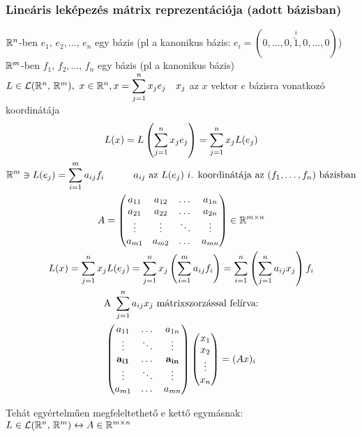 \subsubsection[Lineáris leképezés mátrix reprezentációja]{Lineáris leképezés mátrix reprezentációja (adott bázisban)}
$\mathbb{R}^n$-ben $e_1,\,e_2,\dotsc,\,e_n$ egy bázis (pl a kanonikus bázis: $e_i=(0,\dotsc,0, \overset{i}{\breve{1}},
0,\dotsc,0)$)\\
$\mathbb{R}^m$-ben $f_1,\,f_2,\dotsc,\,f_n$ egy bázis (pl a kanonikus bázis)\\
$L\in\mathcal{L}(\mathbb{R}^n,\,\mathbb{R}^m),\ x\in \mathbb{R}^n,\displaystyle x = \sum_{j=1}^n x_j e_j\quad x_j$ az $x$ vektor $e$ bázisra vonatkozó
koordinátája
\begin{gather*}
  \displaystyle  L(x) = L\left(\sum_{j=1}^n x_j e_j\right) = \sum_{j=1}^n x_j L(e_j)\\
  \mathbb{R}^m \owns L(e_j) = \sum_{i=1}^m a_{ij} f_i\qquad\quad\text{$a_{ij}$ az $L(e_j)$ $i$. koordinátája az
  $(f_1,\dotsc,f_n)$ bázisban}\\
  A = \begin{pmatrix}
    a_{11} & a_{12} & \dots & a_{1n}\\
    a_{21} & a_{22} & \dots & a_{2n}\\
    \vdots & \vdots & \ddots & \vdots\\
    a_{m1} & a_{m2} & \dots & a_{mn}
  \end{pmatrix}\in \mathbb{R}^{m\times n}\\
  L(x) = \sum_{j=1}^n x_j L(e_j) = \sum_{j=1}^n x_j \left(\sum_{i=1}^m a_{ij} f_i\right) = \sum_{i=1}^n
  \left(\sum_{j=1}^n a_{ij} x_j\right) f_i\\
  \text{A } \sum_{j=1}^n a_{ij} x_j \text{ mátrixszorzással felírva:}\\
  \begin{pmatrix}
    a_{11} & \dots & a_{1n}\\
    \vdots & \ddots & \vdots\\
    \mathbf{a_{i1}} &  \dots & \mathbf{a_{in}}\\ 
    \vdots & \ddots & \vdots\\
    a_{m1}  & \dots & a_{mn}
  \end{pmatrix}
  \begin{pmatrix}x_1\\x_2\\\vdots\\x_n\end{pmatrix} = (Ax)_i
\end{gather*}

Tehát egyértelműen megfeleltethető e kettő egymásnak:\\
$L\in \mathcal{L}(\mathbb{R}^n,\,\mathbb{R}^m)\leftrightarrow A\in \mathbb{R}^{m\times n}$


